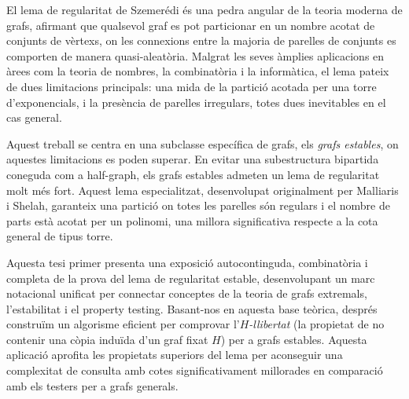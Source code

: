 \documentclass[11pt]{article}
\begin{document}
    El lema de regularitat de Szemerédi és una pedra angular de la teoria moderna de grafs, afirmant que qualsevol graf
    es pot particionar en un nombre acotat de conjunts de vèrtexs, on les connexions entre la majoria de parelles de
    conjunts es comporten de manera quasi-aleatòria.
    Malgrat les seves àmplies aplicacions en àrees com la teoria de nombres, la combinatòria i la informàtica,
    el lema pateix de dues limitacions principals: una mida de la partició acotada per una torre d'exponencials,
    i la presència de parelles irregulars, totes dues inevitables en el cas general.

    Aquest treball se centra en una subclasse específica de grafs, els \emph{grafs estables}, on aquestes limitacions
    es poden superar.
    En evitar una subestructura bipartida coneguda com a half-graph, els grafs estables admeten un lema de regularitat
    molt més fort.
    Aquest lema especialitzat, desenvolupat originalment per Malliaris i Shelah, garanteix una partició on totes les
    parelles són regulars i el nombre de parts està acotat per un polinomi, una millora significativa respecte a la cota
    general de tipus torre.

    Aquesta tesi primer presenta una exposició autocontinguda, combinatòria i completa de la prova del lema de
    regularitat estable, desenvolupant un marc notacional unificat per connectar conceptes de la teoria de grafs
    extremals, l'estabilitat i el property testing.
    Basant-nos en aquesta base teòrica, després construïm un algorisme eficient per comprovar l'\emph{$H$-llibertat}
    (la propietat de no contenir una còpia induïda d'un graf fixat $H$) per a grafs estables.
    Aquesta aplicació aprofita les propietats superiors del lema per aconseguir una complexitat de consulta amb cotes
    significativament millorades en comparació amb els testers per a grafs generals.
\end{document}
